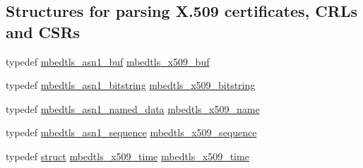 \subsection*{Structures for parsing X.509 certificates, C\+R\+Ls and C\+S\+Rs}
\begin{DoxyCompactItemize}
\item 
typedef \hyperlink{structmbedtls__asn1__buf}{mbedtls\+\_\+asn1\+\_\+buf} \hyperlink{group__x509__module_ga4d02c9e8e4e2934555e0d132cd2976dc}{mbedtls\+\_\+x509\+\_\+buf}
\item 
typedef \hyperlink{structmbedtls__asn1__bitstring}{mbedtls\+\_\+asn1\+\_\+bitstring} \hyperlink{group__x509__module_gaf25a97602f25027e160f22f6d5590636}{mbedtls\+\_\+x509\+\_\+bitstring}
\item 
typedef \hyperlink{structmbedtls__asn1__named__data}{mbedtls\+\_\+asn1\+\_\+named\+\_\+data} \hyperlink{group__x509__module_ga2272228c7776102328df31623af3168c}{mbedtls\+\_\+x509\+\_\+name}
\item 
typedef \hyperlink{structmbedtls__asn1__sequence}{mbedtls\+\_\+asn1\+\_\+sequence} \hyperlink{group__x509__module_gabd52d60a09315854d9ef849d02154f35}{mbedtls\+\_\+x509\+\_\+sequence}
\item 
typedef \hyperlink{interfacestruct}{struct} \hyperlink{structmbedtls__x509__time}{mbedtls\+\_\+x509\+\_\+time} \hyperlink{group__x509__module_ga38827540a02fb2ddca08ec0917a8a41b}{mbedtls\+\_\+x509\+\_\+time}
\end{DoxyCompactItemize}
